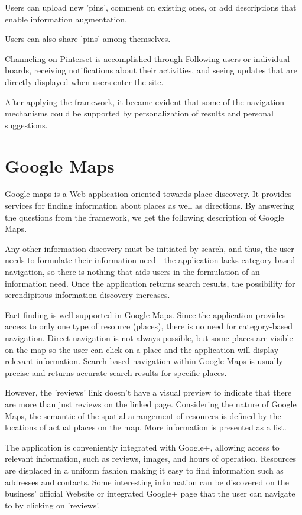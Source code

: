 {Users can upload new 'pins', comment on existing ones, or add descriptions that enable information augmentation. 

Users can also share 'pins' among themselves. 

Channeling on Pinterset is accomplished through Following users or individual boards, receiving notifications about their activities, and seeing updates that are directly displayed when users enter the site. 

After applying the framework, it became evident that some of the navigation mechanisms could be supported by personalization of results and personal suggestions.

} %


{\section{Google Maps}
Google maps is a Web application oriented towards place discovery. It provides services for finding information about places as well as directions.  By answering the questions from the framework, we get the following description of Google Maps.

  Any other information discovery must be initiated by search, and thus, the user needs to formulate their information need---the application lacks category-based navigation, so there is nothing that aids users in the formulation of an information need. Once the application returns search results, the possibility for serendipitous information discovery increases.  

Fact finding is well supported in Google Maps. Since the application provides access to only one type of resource (places), there is no need for category-based navigation. Direct navigation is not always possible, but some places are visible on the map so the user can click on a place and the application will display relevant information. Search-based navigation within Google Maps is usually precise and returns accurate search results for specific places. 

However, the 'reviews' link doesn't have a visual preview to indicate that there are more than just reviews on the linked page. Considering the nature of Google Maps, the semantic of the spatial arrangement of resources is defined by the locations of actual places on the map. More information is presented as a list. 

The application is conveniently integrated with Google+, allowing access to relevant information, such as reviews, images, and hours of operation. Resources are displaced in a uniform fashion making it easy to find information such as addresses and contacts. Some interesting information can be discovered on the business' official Website or integrated Google+ page that the user can navigate to by clicking on 'reviews'.

}
